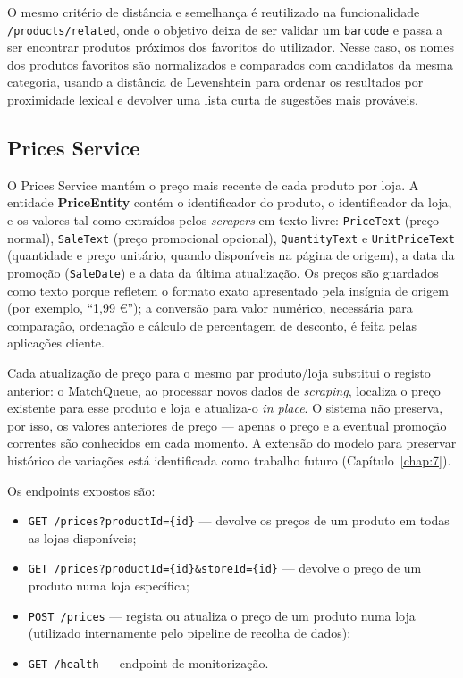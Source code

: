 O mesmo critério de distância e semelhança é reutilizado na funcionalidade \texttt{/products/related}, onde o objetivo deixa de ser validar um \texttt{barcode} e passa a ser encontrar produtos próximos dos favoritos do utilizador. Nesse caso, os nomes dos produtos favoritos são normalizados e comparados com candidatos da mesma categoria, usando a distância de Levenshtein para ordenar os resultados por proximidade lexical e devolver uma lista curta de sugestões mais prováveis.

\subsection{Prices Service}
\label{sec:4.2.3}

O Prices Service mantém o preço mais recente de cada produto por loja. A entidade \textbf{PriceEntity} contém o identificador do produto, o identificador da loja, e os valores tal como extraídos pelos \textit{scrapers} em texto livre: \texttt{PriceText} (preço normal), \texttt{SaleText} (preço promocional opcional), \texttt{QuantityText} e \texttt{UnitPriceText} (quantidade e preço unitário, quando disponíveis na página de origem), a data da promoção (\texttt{SaleDate}) e a data da última atualização. Os preços são guardados como texto porque refletem o formato exato apresentado pela insígnia de origem (por exemplo, ``1,99 €''); a conversão para valor numérico, necessária para comparação, ordenação e cálculo de percentagem de desconto, é feita pelas aplicações cliente.

Cada atualização de preço para o mesmo par produto/loja substitui o registo anterior: o MatchQueue, ao processar novos dados de \textit{scraping}, localiza o preço existente para esse produto e loja e atualiza-o \textit{in place}. O sistema não preserva, por isso, os valores anteriores de preço — apenas o preço e a eventual promoção correntes são conhecidos em cada momento. A extensão do modelo para preservar histórico de variações está identificada como trabalho futuro (Capítulo~\ref{chap:7}).

Os endpoints expostos são:

\begin{itemize}
    \item \texttt{GET /prices?productId=\{id\}} — devolve os preços de um produto em todas as lojas disponíveis;
    \item \texttt{GET /prices?productId=\{id\}\&storeId=\{id\}} — devolve o preço de um produto numa loja específica;
    \item \texttt{POST /prices} — regista ou atualiza o preço de um produto numa loja (utilizado internamente pelo pipeline de recolha de dados);
    \item \texttt{GET /health} — endpoint de monitorização.
\end{itemize}

